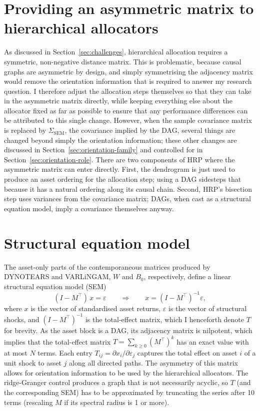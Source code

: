 \documentclass[11pt, a4paper]{report}
\begin{document}
\section{Providing an asymmetric matrix to hierarchical allocators}
\label{sec:symm}

As discussed in Section~\ref{sec:challenges}, hierarchical allocation requires a
symmetric, non-negative distance matrix. This is problematic, because causal graphs are asymmetric by design, and simply symmetrising the adjacency matrix would remove the orientation information that is required to answer my research question.
I therefore adjust the allocation steps themselves so that they can take in the asymmetric matrix directly, while keeping everything else about the allocator fixed as far as possible to ensure that any performance differences can be attributed to this single change.
However, when the sample covariance matrix is replaced by $\Sigma_{\mathrm{SEM}}$, the covariance implied by the DAG, several things are changed beyond simply the orientation information; these other changes are discussed in Section~\ref{sec:orientation-family} and controlled for in Section~\ref{sec:orientation-role}.
There are two components of HRP where the asymmetric matrix can enter
directly. First, the dendrogram is just used to produce an asset ordering for the allocation step; using a DAG sidesteps that because it has a natural ordering along its causal chain. 
Second, HRP's bisection step uses variances from the covariance matrix; DAGs, when cast as a structural equation model, imply a covariance themselves anyway.

\section{Structural equation model}
\label{sec:sem}

The asset-only parts of the contemporaneous matrices produced by DYNOTEARS and VARLiNGAM,
$W$ and $B_0$, respectively, define a linear structural
equation model (SEM) \cite{wright1934path,bollen1989sem}
\begin{equation}   (I - M^\top)\, x = \varepsilon
\qquad\Longrightarrow\qquad   x = (I - M^\top)^{-1} \varepsilon, \label{eq:sem} \end{equation}
where $x$ is the vector of standardised asset returns, $\varepsilon$ is the vector of
structural shocks, and $(I - M^\top)^{-1}$ is the total-effect matrix, which I henceforth denote $T$ for brevity.
As the asset block is a DAG, its adjacency matrix is
nilpotent, which implies that the total-effect matrix $T = \sum_{k\ge 0}
(M^\top)^k$ has an exact value with at most $N$ terms.
Each entry $T_{ij} = \partial
x_i / \partial \varepsilon_j$ 
captures the total effect on asset $i$ of a unit shock to asset $j$ along all directed paths. 
The asymmetry of this matrix allows for orientation information to be used by the hierarchical allocators. The ridge-Granger control produces a graph that is not necessarily acyclic, so $T$ (and the corresponding SEM) has to be approximated by truncating the series after 10 terms (rescaling $M$ if its spectral radius is 1 or more).
\end{document}
